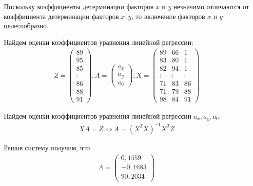 \documentclass[utf8, a4paper, 14pt, russian, oneside]{book}
\begin{document}
Поскольку коэффициенты детерминации факторов $x$ и $y$ незначимо отличаются от коэффициента детерминации факторов $x, y$, то включение факторов $x$ и $y$ целесообразно.

Найдем оценки коэффициентов уравнения линейной регрессии:
\begin{gather*}
    Z = \begin{pmatrix}
        89 \\
        95 \\
        85 \\
        \vdots \\
        86 \\ 
        88 \\ 
        91
    \end{pmatrix};
    A = \begin{pmatrix}
        a_x \\
        a_y \\
        a_0
    \end{pmatrix};
    X = \begin{pmatrix}
        89 & 66 & 1 \\
        83 & 80 & 1 \\
        82 & 94 & 1 \\
        \vdots & \vdots & \vdots \\
        71 & 83 & 86 \\
        71 & 79 & 88 \\
        98 & 84 & 91
    \end{pmatrix}
\end{gather*}

Найдем оценки коэффициентов уравнения линейной регрессии $a_x, a_y, a_0$:
\begin{gather*}
    XA=Z \Leftrightarrow A = (X^TX)^{-1}X^TZ
\end{gather*}

Решив систему получим, что
\begin{gather*}
    A = \begin{pmatrix}
        0,1559 \\
        -0,1683 \\
        90,2034
    \end{pmatrix}
\end{gather*}
\end{document}
